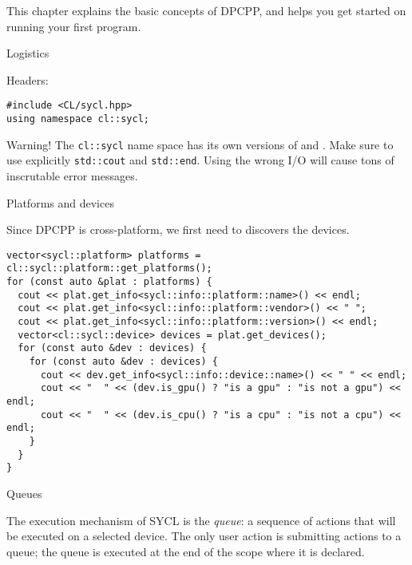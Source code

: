 
This chapter explains the basic concepts of
\ac{DPCPP}, and helps you get
started on running your first program.

 {Logistics}

Headers:
\begin{lstlisting}
#include <CL/sycl.hpp>
using namespace cl::sycl;
\end{lstlisting}

\begin{remark}
  Warning!
  The \lstinline+cl::sycl+ name space has its own versions of  and .
  Make sure to use explicitly \lstinline+std::cout+ and \lstinline+std::end+.
  Using the wrong I/O will cause tons of inscrutable error messages.
\end{remark}

 {Platforms and devices}

Since \ac{DPCPP} is cross-platform, we first need to discovers
the devices.

\begin{lstlisting}
vector<sycl::platform> platforms = cl::sycl::platform::get_platforms();
for (const auto &plat : platforms) {
  cout << plat.get_info<sycl::info::platform::name>() << endl;
  cout << plat.get_info<sycl::info::platform::vendor>() << " ";
  cout << plat.get_info<sycl::info::platform::version>() << endl;
  vector<cl::sycl::device> devices = plat.get_devices();
  for (const auto &dev : devices) {
    for (const auto &dev : devices) {
      cout << dev.get_info<sycl::info::device::name>() << " " << endl;
      cout << "  " << (dev.is_gpu() ? "is a gpu" : "is not a gpu") << endl;
      cout << "  " << (dev.is_cpu() ? "is a cpu" : "is not a cpu") << endl;
    }
  }
}
\end{lstlisting}

 {Queues}

The execution mechanism of SYCL is the
\emph{queue}:
a sequence of actions that will be executed on a selected device.
The only user action is submitting actions to a queue;
the queue is executed at the end of the scope where it is declared.

